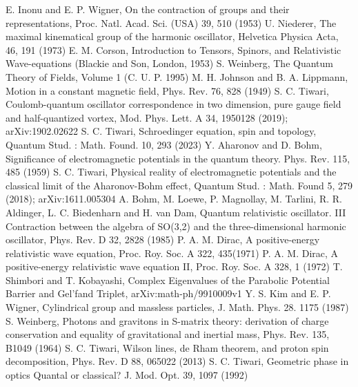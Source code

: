 \documentclass[aps, singlecolumn, showpacs]{revtex4-2}
\begin{document}
\begin{thebibliography}{99}
 E. Inonu and E. P. Wigner, On the contraction of groups and their representations, Proc. Natl. Acad. Sci. (USA) 39, 510 (1953)
 U. Niederer, The maximal kinematical group of the harmonic oscillator, Helvetica Physica Acta, 46, 191 (1973)
 E. M. Corson, Introduction to Tensors, Spinors, and Relativistic Wave-equations (Blackie and Son, London, 1953)
 S. Weinberg, The Quantum Theory of Fields, Volume 1 (C. U. P. 1995)
 M. H. Johnson and B. A. Lippmann, Motion in a constant magnetic field, Phys. Rev. 76, 828 (1949)
 S. C. Tiwari, Coulomb-quantum oscillator correspondence in two dimension, pure gauge field and half-quantized vortex, Mod. Phys. Lett. A 34, 1950128 (2019); arXiv:1902.02622
 S. C. Tiwari, Schroedinger equation, spin and topology, Quantum Stud. : Math. Found. 10, 293  (2023)
 Y. Aharonov and D. Bohm, Significance of electromagnetic potentials in the quantum theory. Phys. Rev. 115, 485 (1959)
 S. C. Tiwari, Physical reality of electromagnetic potentials and the classical limit of the Aharonov-Bohm effect, Quantum Stud. : Math. Found 5, 279 (2018); arXiv:1611.005304
 A. Bohm, M. Loewe, P. Magnollay, M. Tarlini, R. R. Aldinger, L. C. Biedenharn and H. van Dam, Quantum relativistic oscillator. III Contraction between the algebra of SO(3,2) and the three-dimensional harmonic oscillator, Phys. Rev. D 32, 2828 (1985)
 P. A. M. Dirac, A positive-energy relativistic wave equation, Proc. Roy. Soc. A 322, 435(1971) 
 P. A. M. Dirac, A positive-energy relativistic wave equation II, Proc. Roy. Soc. A 328, 1 (1972)
 T. Shimbori and T. Kobayashi,  Complex Eigenvalues of the Parabolic Potential Barrier and Gel’fand Triplet, arXiv:math-ph/9910009v1
 Y. S. Kim and E. P. Wigner, Cylindrical group and massless particles, J. Math. Phys. 28. 1175 (1987)
 S. Weinberg, Photons and gravitons in S-matrix theory: derivation of charge conservation and equality of gravitational and inertial mass, Phys. Rev. 135, B1049 (1964)
 S. C. Tiwari, Wilson lines, de Rham theorem, and proton spin decomposition, Phys. Rev. D 88, 065022 (2013)
 S. C. Tiwari, Geometric phase in optics Quantal or classical? J. Mod. Opt. 39, 1097 (1992)

\end{thebibliography}
\end{document}

